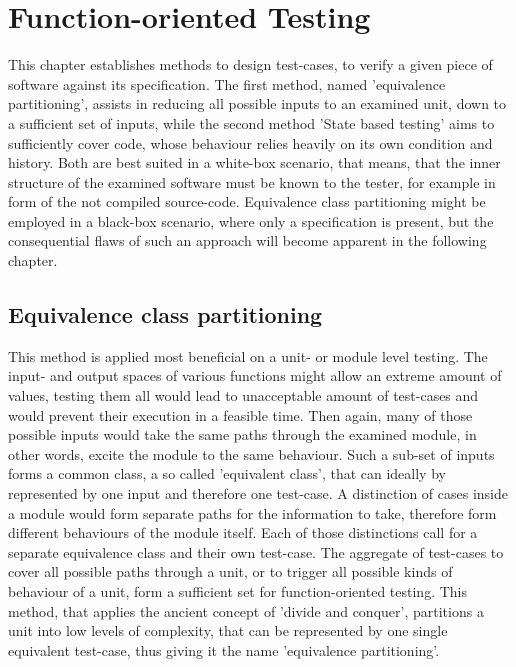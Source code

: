 \documentclass[master,english,smartquotes,apa]{hgbthesis}
\newcommand{\TODO}[1]{\textcolor{red}{\textbf{ToDo:} #1}}
\begin{document}
		
	

	\section{Function-oriented Testing}

	This chapter establishes methods to design test-cases, to verify a given piece of software against its specification. The first method, named 'equivalence partitioning', assists in reducing all possible inputs to an examined unit, down to a sufficient set of inputs, while the second method 'State based testing' aims to sufficiently cover code, whose behaviour relies heavily on its own condition and history. Both are best suited in a white-box scenario, that means, that the inner structure of the examined software must be known to the tester, for example in form of the not compiled source-code. Equivalence class partitioning might be employed in a black-box scenario, where only a specification is present, but the consequential flaws of such an approach will become apparent in the following chapter.

	\subsection{Equivalence class partitioning}
	This method is applied most beneficial on a unit- or module level testing. The input- and output spaces of various functions might allow an extreme amount of values, testing them all would lead to unacceptable amount of test-cases and would prevent their execution in a feasible time. Then again, many of those possible inputs would take the same paths through the examined module, in other words, excite the module to the same behaviour. Such a sub-set of inputs forms a common class, a so called 'equivalent class', that can ideally by represented by one input and therefore one test-case. A distinction of cases inside a module would form separate paths for the information to take, therefore form different behaviours of the module itself. Each of those distinctions call for a separate equivalence class and their own test-case. The aggregate of test-cases to cover all possible paths through a unit, or to trigger all possible kinds of behaviour of a unit, form a sufficient set for function-oriented testing. This method, that applies the ancient concept of 'divide and conquer', partitions a unit into low levels of complexity, that can be represented by one single equivalent test-case, thus giving it the name 'equivalence partitioning'.
\end{document}
